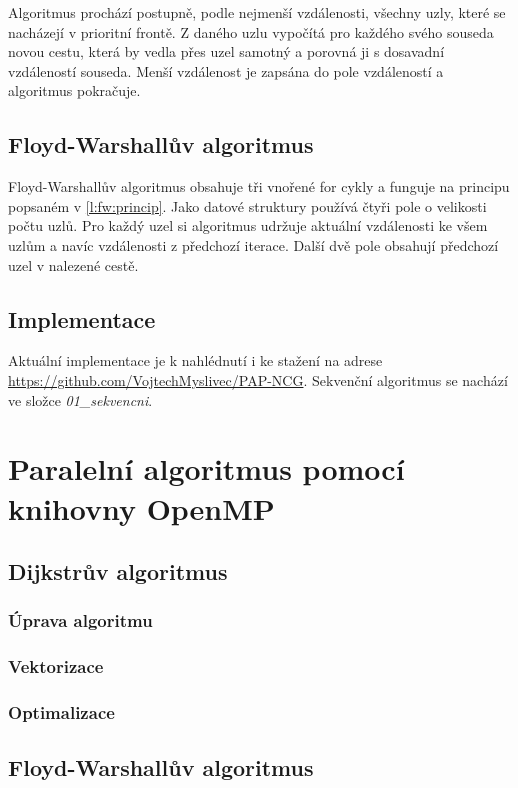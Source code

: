 Algoritmus prochází postupně, podle nejmenší vzdálenosti, všechny uzly, které se nacházejí v prioritní frontě. Z daného uzlu vypočítá pro každého svého souseda novou cestu, která by vedla přes uzel samotný a porovná ji s dosavadní vzdáleností souseda. Menší vzdálenost je zapsána do pole vzdáleností a algoritmus pokračuje.


\subsection{Floyd-Warshallův algoritmus}
Floyd-Warshallův algoritmus obsahuje tři vnořené for cykly a funguje na principu popsaném v \ref{l:fw:princip}. Jako datové struktury používá čtyři pole o velikosti počtu uzlů. Pro každý uzel si algoritmus udržuje aktuální vzdálenosti ke všem uzlům a navíc vzdálenosti z předchozí iterace. Další dvě pole obsahují předchozí uzel v nalezené cestě. 

\subsection{Implementace}
Aktuální implementace je k nahlédnutí i ke stažení na adrese \url{https://github.com/VojtechMyslivec/PAP-NCG}. Sekvenční algoritmus se nachází ve složce \textit{01\_sekvencni}.


\section{Paralelní algoritmus pomocí knihovny OpenMP}
\subsection{Dijkstrův algoritmus}
\subsubsection{Úprava algoritmu}
\subsubsection{Vektorizace}
\subsubsection{Optimalizace}


\subsection{Floyd-Warshallův algoritmus}
